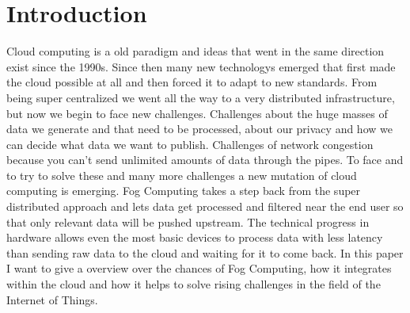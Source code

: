 \section{Introduction}

Cloud computing is a old paradigm and ideas that went in the same direction exist since the 1990s. Since then many new technologys emerged that first made the cloud possible at all and then forced it to adapt to new standards. From being super centralized we went all the way to a very distributed infrastructure, but now we begin to face new challenges. Challenges about the huge masses of data we generate and that need to be processed, about our privacy and how we can decide what data we want to publish. Challenges of network congestion because you can't send unlimited amounts of data through the pipes. To face and to try to solve these and many more challenges a new mutation of cloud computing is emerging. Fog Computing takes a step back from the super distributed approach and lets data get processed and filtered near the end user so that only relevant data will be pushed upstream. The technical progress in hardware allows even the most basic devices to process data with less latency than sending raw data to the cloud and waiting for it to come back. In this paper I want to give a overview over the chances of Fog Computing, how it integrates within the cloud and how it helps to solve rising challenges in the field of the Internet of Things.